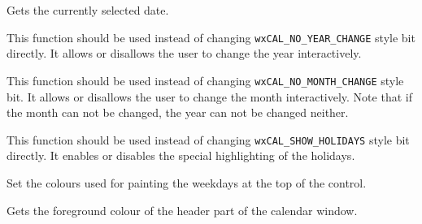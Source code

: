
Gets the currently selected date.

\label{wxcalendarctrlenableyearchange}


This function should be used instead of changing {\tt wxCAL\_NO\_YEAR\_CHANGE}
style bit directly. It allows or disallows the user to change the year
interactively.

\label{wxcalendarctrlenablemonthchange}


This function should be used instead of changing 
{\tt wxCAL\_NO\_MONTH\_CHANGE} style bit. It allows or disallows the user to
change the month interactively. Note that if the month can not be changed, the
year can not be changed neither.

\label{wxcalendarctrlenableholidaydisplay}


This function should be used instead of changing {\tt wxCAL\_SHOW\_HOLIDAYS}
style bit directly. It enables or disables the special highlighting of the
holidays.

\label{wxcalendarctrlsetheadercolours}


Set the colours used for painting the weekdays at the top of the control.

\label{wxcalendarctrlgetheadercolourfg}


Gets the foreground colour of the header part of the calendar window.



\label{wxcalendarctrlgetheadercolourbg}


